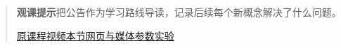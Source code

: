 \begin{quote}\small\textbf{观课提示}\quad 把公告作为学习路线导读，记录后续每个新概念解决了什么问题。

\href{https://www.youtube.com/watch?v=ppWPuXsnf1Q}{原课程视频}\quad\href{https://vitael04213.github.io/3blue1brown-notes/lessons/lockdown-math-announcement.html}{本节网页与媒体}\quad\href{https://vitael04213.github.io/3blue1brown-notes/lab.html\#vectors}{参数实验}
\end{quote}
